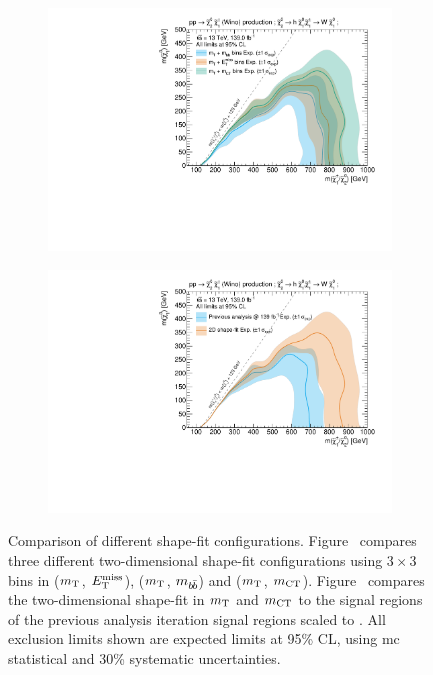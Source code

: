  \begin{figure}
	\centering
	\begin{subfigure}[b]{0.5\linewidth}
		\centering\includegraphics[width=1.0\textwidth]{HF/plot_binnings}
		\caption{\label{fig:plot_binnings}}
	\end{subfigure}\hfill
	\begin{subfigure}[b]{0.5\linewidth}
		\centering\includegraphics[width=1.0\textwidth]{HF/plot_2d_shapefit}
		\caption{\label{fig:previous_analysis_comparison}}
	\end{subfigure}\hfill

	\caption{Comparison of different shape-fit configurations. Figure~ compares three different two-dimensional shape-fit configurations using $3\times 3$ bins in ($m_{\textrm{T}}$, $E_{\textrm{T}}^{\textrm{miss}}$), ($m_{\textrm{T}}$, $m_{b\hspace{-0.06em}\bar{b}}$) and ($m_{\textrm{T}}$, $m_{\textrm{CT}}$). Figure~ compares the two-dimensional shape-fit in $m_{\textrm{T}}$ and $m_{\textrm{CT}}$ to the signal regions of the previous analysis iteration signal regions scaled to \onethirtynineifb. All exclusion limits shown are expected limits at 95\% CL, using \gls{mc} statistical and 30\% systematic uncertainties.}
	\label{fig:results_HF_scans}
\end{figure}


